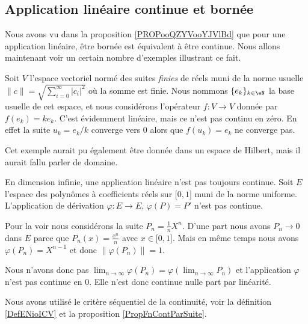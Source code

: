 \subsection{Application linéaire continue et bornée}

Nous avons vu dans la proposition \ref{PROPooQZYVooYJVlBd} que pour une application linéaire, être bornée est équivalent à être continue. Nous allons maintenant voir un certain nombre d'exemples illustrant ce fait.

\begin{example}  \label{ExHKsIelG}
    Soit \( V\) l'espace vectoriel normé des suites \emph{finies} de réels muni de la norme usuelle $\| c \|=\sqrt{\sum_{i=0}^{\infty}| c_i |^2}$ où la somme est finie. Nous nommons \( \{ e_k \}_{k\in \eN}\) la base usuelle de cet espace, et nous considérons l'opérateur \( f\colon V\to V\) donnée par \( f(e_k)=ke_k\). C'est évidemment linéaire, mais ce n'est pas continu en zéro. En effet la suite \( u_k=e_k/k\) converge vers \( 0\) alors que \( f(u_k)=e_k\) ne converge pas.
\end{example}

Cet exemple aurait pu également être donnée dans un espace de Hilbert, mais il aurait fallu parler de domaine.


\begin{example}      \label{EXooDMVJooAJywMU}
    En dimension infinie, une application linéaire n'est pas toujours continue. Soit \( E\) l'espace des polynômes à coefficients réels sur \( \mathopen[ 0 , 1 \mathclose]\) muni de la norme uniforme. L'application de dérivation \( \varphi\colon E\to E\), \( \varphi(P)=P'\) n'est pas continue.

    Pour la voir nous considérons la suite \( P_n=\frac{1}{ n }X^n\). D'une part nous avons \( P_n\to 0\) dans \( E\) parce que \( P_n(x)=\frac{ x^n }{ n }\) avec \( x\in \mathopen[ 0 , 1 \mathclose]\). Mais en même temps nous avons \( \varphi(P_n)=X^{n-1}\) et donc \( \| \varphi(P_n) \|=1\).

    Nous n'avons donc pas \( \lim_{n\to \infty} \varphi(P_n)=\varphi(\lim_{n\to \infty} P_n)\) et l'application \( \varphi\) n'est pas continue en \( 0\). Elle n'est donc continue nulle part par linéarité.

    Nous avons utilisé le critère séquentiel de la continuité, voir la définition \ref{DefENioICV} et la proposition \ref{PropFnContParSuite}.
\end{example}


